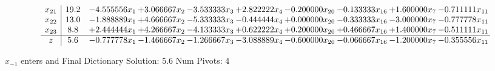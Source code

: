 \documentclass[10pt]{article}
\begin{document}
\[\begin{array}{c| c c@{\hskip 2pt} c@{\hskip 2pt} c@{\hskip 2pt} c@{\hskip 2pt} c@{\hskip 2pt} c@{\hskip 2pt} c@{\hskip 2pt} c@{\hskip 2pt} }
 x_{21}   &  19.2 & -4.555556 x_{1} & + 3.066667 x_{2} & -3.533333 x_{3} & + 2.822222 x_{4} & -0.200000 x_{20} & -0.133333 x_{16} & + 1.600000 x_{7} & -0.711111 x_{11}\\
 x_{22}   &  13.0 & -1.888889 x_{1} & + 4.666667 x_{2} & -5.333333 x_{3} & -0.444444 x_{4} & + 0.000000 x_{20} & -0.333333 x_{16} & -3.000000 x_{7} & -0.777778 x_{11}\\
 x_{23}   &  8.8 & + 2.444444 x_{1} & + 4.266667 x_{2} & -4.133333 x_{3} & + 0.622222 x_{4} & + 0.200000 x_{20} & + 0.466667 x_{16} & + 1.400000 x_{7} & -0.511111 x_{11}\\
\hline
z    &  5.6 & -0.777778 x_{1} & -1.466667 x_{2} & -1.266667 x_{3} & -3.088889 x_{4} & -0.600000 x_{20} & -0.066667 x_{16} & -1.200000 x_{7} & -0.355556 x_{11}\\
\end{array}\]


 $ x_{-1} $ enters and Final Dictionary
Solution:  5.6
Num Pivots:  4
\end{document}
